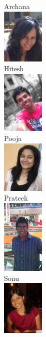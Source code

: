 \documentclass[12pt]{beamer}
\begin{document}
\section{}
\begin{frame}[c]
\begin{columns}[c]
Archana\\
\includegraphics[width=2cm]{./arch.jpg}\\[12pt]
Hitesh\\
\includegraphics[width=2cm]{./h.jpg}\\
\vskip-8pt
Pooja\\
\includegraphics[width=2cm]{./poo.jpg}\\[12pt]
Prateek\\
\includegraphics[width=2cm]{./pr22.jpg}\\
Sonu\\
\includegraphics[width=2cm]{./sonu.jpg}\\[12pt]

\end{columns}
\end{frame}
\end{document}
